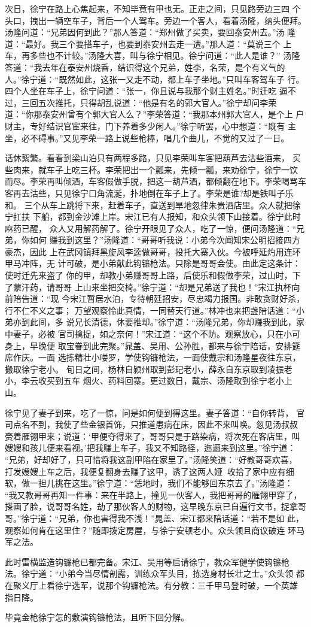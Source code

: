 次日，徐宁在路上心焦起来，不知毕竟有甲也无。正走之间，只见路旁边三四
个头口，拽出一辆空车子，背后一个人驾车。旁边一个客人，看着汤隆，纳头便拜。
汤隆问道：“兄弟因何到此？”那人答道：“郑州做了买卖，要回泰安州去。”汤
隆道：“最好。我三个要搭车子，也要到泰安州去走一遭。”那人道：“莫说三个
上车，再多些也不计较。”汤隆大喜，叫与徐宁相见。徐宁问道：“此人是谁？”
汤隆答道：“我去年在泰安州烧香，结识得这个兄弟，姓李，名荣，是个有义气的
人。”徐宁道：“既然如此，这张一又走不动，都上车子坐地。”只叫车客驾车子
行。四个人坐在车子上，徐宁问道：“张一，你且说与我那个财主姓名。”时迁吃
逼不过，三回五次推托，只得胡乱说道：“他是有名的郭大官人。”徐宁却问李荣
道：“你那泰安州曾有个郭大官人么？”李荣答道：“我那本州郭大官人，是个上
户财主，专好结识官宦来往，门下养着多少闲人。”徐宁听罢，心中想道：“既有
主坐，必不碍事。”又见李荣一路上说些枪棒，唱几个曲儿，不觉的又过了一日。

话休絮繁。看看到梁山泊只有两程多路，只见李荣叫车客把葫芦去沽些酒来，
买些肉来，就车子上吃三杯。李荣把出一个瓢来，先倾一瓢，来劝徐宁，徐宁一饮
而尽。李荣再叫倾酒，车客假做手脱，把这一葫芦酒，都倾翻在地下。李荣喝骂车
客再去沽些，只见徐宁口角流涎，扑地倒在车子上了。李荣是谁?却是铁叫子乐和。
三个从车上跳将下来，赶着车子，直送到旱地忽律朱贵酒店里。众人就把徐宁扛扶
下船，都到金沙滩上岸。宋江已有人报知，和众头领下山接着。徐宁此时麻药已醒，
众人又用解药解了。徐宁开眼见了众人，吃了一惊，便问汤隆道：“兄弟，你如何
赚我到这里？”汤隆道：“哥哥听我说：小弟今次闻知宋公明招接四方豪杰，因此
上在武冈镇拜黑旋风李逵做哥哥，投托大寨入伙。今被呼延灼用连环甲马冲阵，无
计可破，是小弟献此钩镰枪法。只除是哥哥会使。由此定这条计：使时迁先来盗了
你的甲，却教小弟赚哥哥上路，后使乐和假做李荣，过山时，下了蒙汗药，请哥哥
上山来坐把交椅。”徐宁道：“却是兄弟送了我也！”宋江执杯向前陪告道：“现
今宋江暂居水泊，专待朝廷招安，尽忠竭力报国。非敢贪财好杀，行不仁不义之事；
万望观察怜此真情，一同替天行道。”林冲也来把盏陪话道：“小弟亦到此间，多
说兄长清德，休要推却。”徐宁道：“汤隆兄弟，你却赚我到此，家中妻子，必被
官司擒捉，如之奈何！”宋江道：“这个不防。观察放心，只在小可身上，早晚便
取宝眷到此完聚。”晁盖、吴用、公孙胜，都来与徐宁陪话，安排筵席作庆。一面
选拣精壮小喽罗，学使钩镰枪法，一面使戴宗和汤隆星夜往东京，搬取徐宁老小。
旬日之间，杨林自颍州取到彭玘老小，薛永自东京取到凌振老小，李云收买到五车
烟火、药料回寨。更过数日，戴宗、汤隆取到徐宁老小上山。

徐宁见了妻子到来，吃了一惊，问是如何便到得这里。妻子答道：“自你转背，
官司点名不到，我使了些金银首饰，只推道患病在床，因此不来叫唤。忽见汤叔叔
赍着雁翎甲来；说道：‘甲便夺得来了，哥哥只是于路染病，将次死在客店里，叫
嫂嫂和孩儿便来看视。’把我赚上车子，我又不知路径，迤逦来到这里。”徐宁道：
“兄弟，好却好了，只可惜将我这副甲陷在家里了。”汤隆笑道：“好教哥哥欢喜，
打发嫂嫂上车之后，我便复翻身去赚了这甲，诱了这两人娅，收拾了家中应有细
软，做一担儿挑在这里。”徐宁道：“恁地时，我们不能够回东京去了。”汤隆道：
“我又教哥哥再知一件事：来在半路上，撞见一伙客人，我把哥哥的雁翎甲穿了，
搽画了脸，说哥哥名姓，劫了那伙客人的财物，这早晚东京已自遍行文书，捉拿哥
哥。”徐宁道：“兄弟，你也害得我不浅！”晁盖、宋江都来陪话道：“若不是如
此，观察如何肯在这里住？”随即拨定房屋，与徐宁安顿老小。众头领且商议破连
环马军之法。

此时雷横监造钩镰枪已都完备。宋江、吴用等启请徐宁，教众军健学使钩镰枪
法。徐宁道：“小弟今当尽情剖露，训练众军头目，拣选身材长壮之士。”众头领
都在聚义厅上看徐宁选军，说那个钩镰枪法。有分教：三千甲马登时破，一个英雄
指日降。

毕竟金枪徐宁怎的敷演钩镰枪法，且听下回分解。